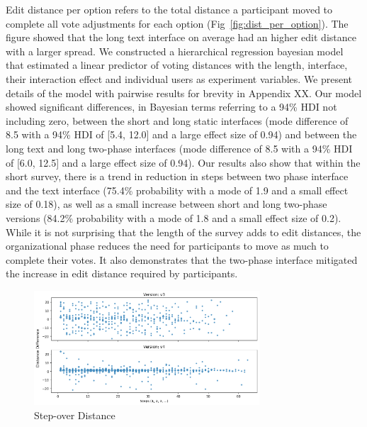 Edit distance per option refers to the total distance a participant moved to complete all vote adjustments for each option (Fig~\ref{fig:dist_per_option}). The figure showed that the long text interface on average had an higher edit distance with a larger spread. We constructed a hierarchical regression bayesian model that estimated a linear predictor of voting distances with the length, interface, their interaction effect and individual users as experiment variables. We present details of the model with pairwise results for brevity in Appendix XX. Our model showed significant differences, in Bayesian terms referring to a 94\% HDI not including zero, between the short and long static interfaces (mode difference of 8.5 with a 94\% HDI of [5.4, 12.0] and a large effect size of 0.94) and between the long text and long two-phase interfaces (mode difference of 8.5 with a 94\% HDI of [6.0, 12.5] and a large effect size of 0.94). Our results also show that within the short survey, there is a trend in reduction in steps between two phase interface and the text interface (75.4\% probability with a mode of 1.9 and a small effect size of 0.18), as well as a small increase between short and long two-phase versions (84.2\% probability with a mode of 1.8 and a small effect size of 0.2). While it is not surprising that the length of the survey adds to edit distances, the organizational phase reduces the need for participants to move as much to complete their votes. It also demonstrates that the two-phase interface mitigated the increase in edit distance required by participants.

\begin{figure}[ht]
    \centering
    \includegraphics[width=0.75\textwidth]{content/image/distance/tmp_step-over-distance.png}
    \caption{Step-over Distance}
    \label{fig:step-over-distance}
\end{figure}

